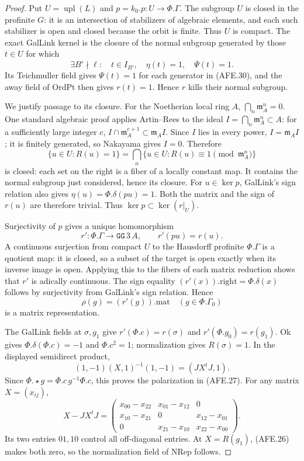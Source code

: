 \begin{proof}
Put \(U=\operatorname{upl}(L)\) and \(p=k_0.p:U\to\Phi.\Gamma\).
The subgroup \(U\) is closed in the profinite \(G\):
it is an intersection of stabilizers of algebraic
elements, and each such stabilizer is open and closed
because the orbit is finite.
Thus \(U\) is compact.
The exact GalLink kernel is the closure of the normal
subgroup generated by those \(t\in U\) for which
\[
 \exists B'\nmid\ell:\quad
 t\in I_{B'},\quad \eta(t)=1,\quad\overline\Psi(t)=1.
                                                        \tag{AFE.30}
\]
Its Teichmuller field gives \(\Psi(t)=1\) for each
generator in (AFE.30), and the away field of OrdPt
then gives \(r(t)=1\).
Hence \(r\) kills their normal subgroup.

We justify passage to its closure.
For the Noetherian local ring \(A\),
\(\bigcap_n\mathfrak m_A^n=0\).
One standard algebraic proof applies Artin--Rees
to the ideal \(I=\bigcap_n\mathfrak m_A^n\subset A\):
for a sufficiently large integer \(c\),
\(I\cap\mathfrak m_A^{c+1}\subset\mathfrak m_A I\).
Since \(I\) lies in every power, \(I=\mathfrak m_A I\);
it is finitely generated, so Nakayama gives \(I=0\).
Therefore
\[
 \{u\in U:R(u)=1\}=
 \bigcap_n\{u\in U:R(u)\equiv1\pmod{\mathfrak m_A^n}\}
 \]
is closed: each set on the right is a fiber of a
locally constant map.  It contains the normal
subgroup just considered, hence its closure.
For \(u\in\ker p\), GalLink's sign relation also gives
\(\eta(u)=\Phi.\delta(pu)=1\).
Both the matrix and the sign of \(r(u)\) are therefore
trivial.  Thus \(\ker p\subset\ker(r|_U)\).

Surjectivity of \(p\) gives a unique homomorphism
\[
                  r':\Phi.\Gamma\to\texttt{GG}\,3\,A,
                         \qquad r'(pu)=r(u).
 \]
A continuous surjection from compact \(U\) to the
Hausdorff profinite \(\Phi.\Gamma\) is a quotient map:
it is closed, so a subset of the target is open
exactly when its inverse image is open.
Applying this to the fibers of each matrix reduction
shows that \(r'\) is adically continuous.
The sign equality \((r'(x)).\mathrm{right}=\Phi.\delta(x)\)
follows by surjectivity from GalLink's sign relation.
Hence
\[
             \rho(g)=(r'(g)).\mathrm{mat}
                         \quad(g\in\Phi.\Gamma_0)
 \]
is a matrix representation.

The GalLink fields at \(\sigma,g_1\) give
\(r'(\Phi.c)=r(\sigma)\) and
\(r'(\Phi.g_0)=r(g_1)\).
Ok gives \(\Phi.\delta(\Phi.c)=-1\) and \(\Phi.c^2=1\);
normalization gives \(R(\sigma)=1\).
In the displayed semidirect product,
\[
 (1,-1)(X,1)^{-1}(1,-1)=(JX^tJ,1).
 \]
Since \(\Phi.\star g=\Phi.c\,g^{-1}\Phi.c\),
this proves the polarization in (AFE.27).
For any matrix \(X=(x_{ij})\),
\[
 X-JX^tJ=
 \begin{pmatrix}
 x_{00}-x_{22}&x_{01}-x_{12}&0\\
 x_{10}-x_{21}&0&x_{12}-x_{01}\\
 0&x_{21}-x_{10}&x_{22}-x_{00}
 \end{pmatrix}.
 \]
Its two entries \(01,10\) control all off-diagonal
entries.  At \(X=R(g_1)\), (AFE.26) makes both zero,
so the normalization field of NRep follows.


\end{proof}
